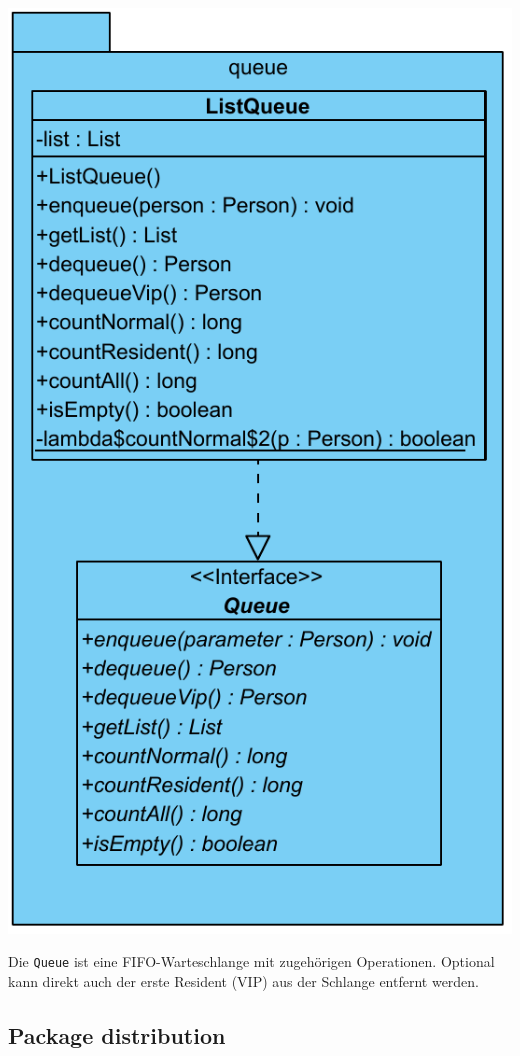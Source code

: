 \includegraphics[scale=0.5]{abbildungen/uml/queue.pdf}

Die \texttt{Queue} ist eine FIFO-Warteschlange mit zugehörigen Operationen. Optional kann direkt auch der erste Resident (VIP) aus der Schlange entfernt werden.

\subsection{Package distribution}


